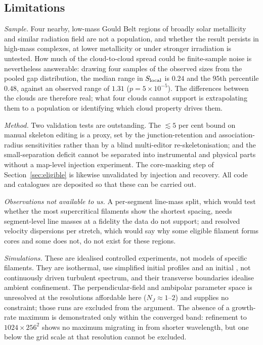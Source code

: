 \documentclass[usenatbib,twoside,twocolumn]{mnras}
\begin{document}
\subsection{Limitations}
\label{sec:limitations}

\emph{Sample.} Four nearby, low-mass Gould Belt regions of broadly solar metallicity and similar radiation field are not a population, and whether the result persists in high-mass complexes, at lower metallicity or under stronger irradiation is untested. How much of the cloud-to-cloud spread could be finite-sample noise is nevertheless answerable: drawing four samples of the observed sizes from the pooled gap distribution, the median range in $S_{\rm local}$ is $0.24$ and the $95$th percentile $0.48$, against an observed range of $1.31$ ($p=5\times10^{-5}$). The differences between the clouds are therefore real; what four clouds cannot support is extrapolating them to a population or identifying which cloud property drives them.

\emph{Method.} Two validation tests are outstanding. The $\lesssim5$ per cent bound on manual skeleton editing is a proxy, set by the junction-retention and association-radius sensitivities rather than by a blind multi-editor re-skeletonisation; and the small-separation deficit cannot be separated into instrumental and physical parts without a map-level injection experiment. The core-masking step of Section~\ref{sec:eligible} is likewise unvalidated by injection and recovery. All code and catalogues are deposited so that these can be carried out.

\emph{Observations not available to us.} A per-segment line-mass split, which would test whether the most supercritical filaments show the shortest spacing, needs segment-level line masses at a fidelity the data do not support; and resolved velocity dispersions per stretch, which would say why some eligible filament forms cores and some does not, do not exist for these regions.

\emph{Simulations.} These are idealised controlled experiments, not models of specific filaments. They are isothermal, use simplified initial profiles and an initial , not continuously driven turbulent spectrum, and their transverse boundaries idealise ambient confinement. The perpendicular-field and ambipolar parameter space is unresolved at the resolutions affordable here ($N_J\approx1$--$2$) and supplies no constraint; those runs are excluded from the argument. The absence of a growth-rate maximum is demonstrated only within the converged band: refinement to $1024\times256^2$ shows no maximum migrating in from shorter wavelength, but one below the grid scale at that resolution cannot be excluded.
\end{document}

